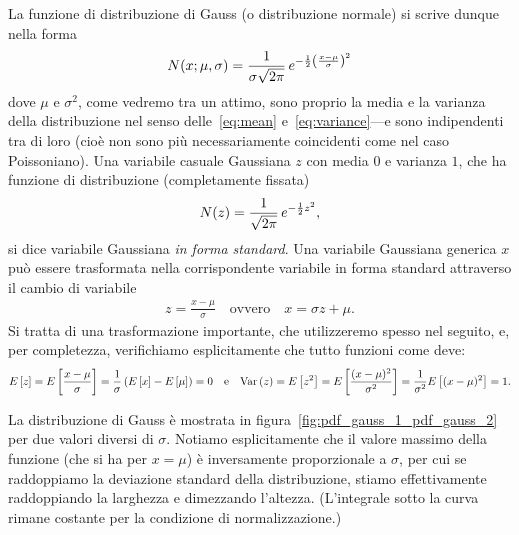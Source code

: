 La funzione di distribuzione di Gauss (o distribuzione normale) si scrive dunque
nella forma
\begin{equation}\label{eq:gauss_pdf}
  \gausspdf[\mu, \sigma]{x} =
  \frac{1}{\sigma\sqrt{2\pi}} \, e^{-\frac{1}{2}\left(\frac{x-\mu}{\sigma}\right)^2}
\end{equation}
dove $\mu$ e $\sigma^2$, come vedremo tra un attimo, sono proprio la media e
la varianza della distribuzione nel senso delle~\eqref{eq:mean}
e~\eqref{eq:variance}---e sono indipendenti tra di loro (cioè non sono più
necessariamente coincidenti come nel caso Poissoniano). Una variabile casuale
Gaussiana $z$ con media $0$ e varianza $1$, che ha funzione di distribuzione
(completamente fissata)
\begin{equation}\label{eq:gauss_pdf_std}
  \gausspdf{z} = \frac{1}{\sqrt{2\pi}} \, e^{-\frac{1}{2}z^2},
\end{equation}
si dice variabile Gaussiana \emph{in forma standard}. Una variabile Gaussiana
generica $x$ può essere trasformata nella corrispondente variabile in forma
standard attraverso il cambio di variabile
\begin{align}\label{eq:gauss_variabile_standard}
  z = \frac{x - \mu}{\sigma} \quad \text{ovvero} \quad
  x = \sigma z + \mu.
\end{align}
Si tratta di una trasformazione importante, che utilizzeremo spesso nel seguito,
e, per completezza, verifichiamo esplicitamente che tutto funzioni come deve:
\begin{align*}
  \displaystyle E\left[z\right] = \displaystyle E\left[\frac{x - \mu}{\sigma}\right] =
  \frac{1}{\sigma}\left(\displaystyle E\left[x\right] - \displaystyle E\left[\mu\right]\right) = 0
  \quad \text{e} \quad
  \text{Var}\left(z\right) = \displaystyle E\left[z^2\right] = \displaystyle E\left[\frac{(x - \mu)^2}{\sigma^2}\right] =
  \frac{1}{\sigma^2}\displaystyle E\left[(x - \mu)^2\right] = 1.
\end{align*}


La distribuzione di Gauss è mostrata in
figura~\ref{fig:pdf_gauss_1_pdf_gauss_2} per due valori diversi di $\sigma$.
Notiamo esplicitamente che il valore massimo della funzione (che si ha per
$x = \mu$) è inversamente proporzionale a $\sigma$, per cui se raddoppiamo
la deviazione standard della distribuzione, stiamo effettivamente
raddoppiando la larghezza e dimezzando l'altezza. (L'integrale sotto la curva
rimane costante per la condizione di normalizzazione.)


